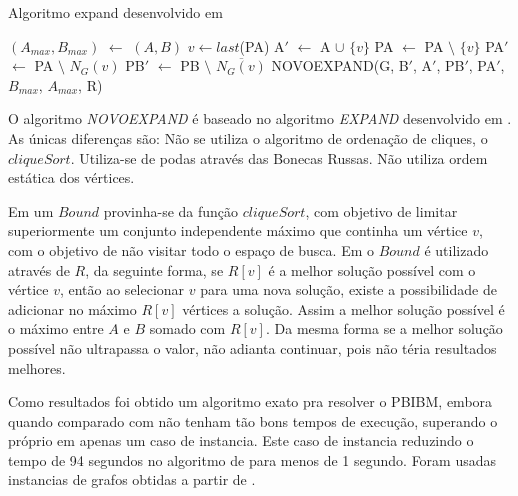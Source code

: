       \begin{algorithm}
        \caption{Algoritmo expand desenvolvido em }
        \label{alg:algoritmo4}
            \begin{algorithmic}[1]
                    \State $(A_{max}, B_{max})$ $\gets$ $(A,B)$
                \EndIf
                    \State $v \gets last$(PA)
                        \Return
                    \EndIf
                    \State A$'$ $\gets$ A $\cup$ $\{v\}$
                    \State PA $\gets$ PA $\setminus$ $\{v\}$
                    \State PA$'$ $\gets$ PA $\setminus$ $N_G(v)$
                    \State PB$'$ $\gets$ PB $\setminus$ $\overline{N_G(v)}$
                    \State NOVOEXPAND(G, B$'$, A$'$, PB$'$, PA$'$, $B_{max}$, $A_{max}$, R)
                \EndWhile

                \EndFunction
                
            \end{algorithmic}
    \end{algorithm}
 
 O algoritmo \textit{NOVOEXPAND} é baseado no algoritmo \textit{EXPAND} desenvolvido em . As únicas  diferenças são: Não se utiliza o algoritmo de ordenação de cliques, o $cliqueSort$. Utiliza-se de podas através das Bonecas Russas. Não utiliza ordem estática dos vértices.
 
 Em  um $Bound$ provinha-se da função $cliqueSort$, com objetivo de limitar superiormente um conjunto independente máximo que continha um vértice $v$, com o objetivo de não visitar todo o espaço de busca. Em  o $Bound$ é utilizado através de $R$, da seguinte forma, se $R[v]$ é a melhor solução possível com o vértice $v$, então ao selecionar $v$ para uma nova solução, existe a possibilidade de adicionar no máximo $R[v]$ vértices a solução. Assim a melhor solução possível é o máximo entre $A$ e $B$ somado com $R[v]$. Da mesma forma se a melhor solução possível não ultrapassa o valor, não adianta continuar, pois não téria resultados melhores.
 
     
Como resultados foi obtido um algoritmo exato pra resolver o \acrshort{PBIBM}, embora quando
comparado com  não tenham tão bons tempos de execução, 
superando o próprio em apenas um caso de instancia. Este caso de instancia reduzindo
o tempo de 94 segundos no algoritmo de  para menos de 1 
segundo. Foram usadas instancias de grafos obtidas a partir de . 















